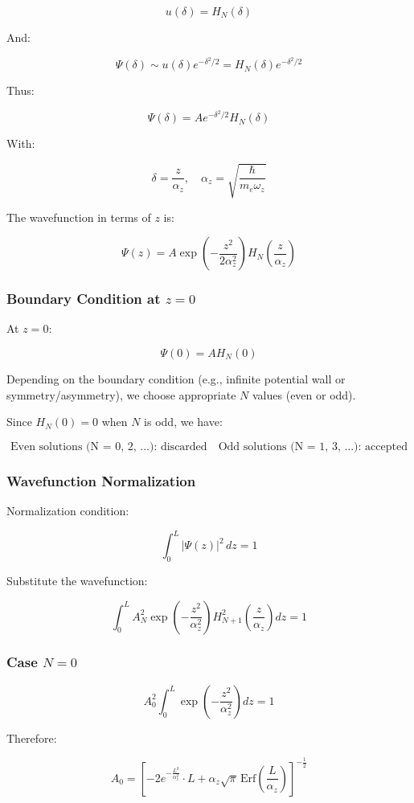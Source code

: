\[
u(\delta) = H_N(\delta)
\]

And:

\[
\Psi(\delta) \sim u(\delta) e^{-\delta^2/2} = H_N(\delta) e^{-\delta^2/2}
\]

Thus:

\[
\Psi(\delta) = A e^{-\delta^2/2} H_N(\delta)
\]

With:

\[
\delta = \frac{z}{\alpha_z}, \quad \alpha_z = \sqrt{\frac{\hbar}{m_e \omega_z}}
\]

The wavefunction in terms of $z$ is:

\[
\Psi(z) = A \exp\left(-\frac{z^2}{2\alpha_z^2}\right) H_N\left(\frac{z}{\alpha_z}\right)
\]

\subsubsection{Boundary Condition at $z = 0$}

At $z = 0$:

\[
\Psi(0) = A H_N(0)
\]

Depending on the boundary condition (e.g., infinite potential wall or symmetry/asymmetry), we choose appropriate $N$ values (even or odd).

Since $H_N(0) = 0$ when $N$ is odd, we have:

\[
\text{Even solutions (N = 0, 2, ...): discarded} \quad \text{Odd solutions (N = 1, 3, ...): accepted}
\]

\subsubsection{Wavefunction Normalization}

Normalization condition:

\[
\int_0^L |\Psi(z)|^2 \, dz = 1
\]

Substitute the wavefunction:

\[
\int_0^L A_N^2 \exp\left(-\frac{z^2}{\alpha_z^2}\right) H_{N+1}^2\left( \frac{z}{\alpha_z} \right) dz = 1
\]

\subsubsection{Case $N = 0$}

\[
A_0^2 \int_0^L \exp\left(-\frac{z^2}{\alpha_z^2}\right) dz = 1
\]

Therefore:

\[
A_0 = \left[ -2 e^{-\frac{L^2}{\alpha_z^2}} \cdot L + \alpha_z \sqrt{\pi} \, \text{Erf}\left( \frac{L}{\alpha_z} \right) \right]^{-\frac{1}{2}}
\]

